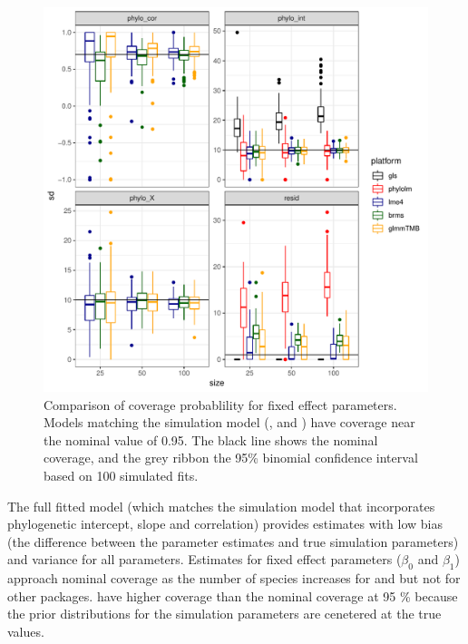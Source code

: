 \documentclass[12pt]{article}
\begin{document}
\begin{center}
\begin{figure}[H]
  \includegraphics[scale=0.8,page=3]{./git_push/plot.Rout.pdf}
  \caption{Comparison of coverage probablility for fixed effect parameters. Models matching the simulation model (,  and ) have coverage near the nominal value of 0.95. The black line shows the nominal coverage, and the grey ribbon the 95\% binomial confidence interval based on 100 simulated fits.}
\label{ssplot_coverage}
\end{figure}
\end{center}

The full fitted model (which matches the simulation model that incorporates phylogenetic intercept, slope and correlation) provides estimates with low bias (the difference between the parameter estimates and true simulation parameters) and variance for all parameters. 
Estimates for fixed effect parameters ($\beta_0$ and $\beta_1$) approach nominal coverage as the number of species increases for  and  but not for other packages.  have higher coverage than the nominal coverage at 95 \% because the prior distributions for the simulation parameters are cenetered at the true values.
\end{document}
